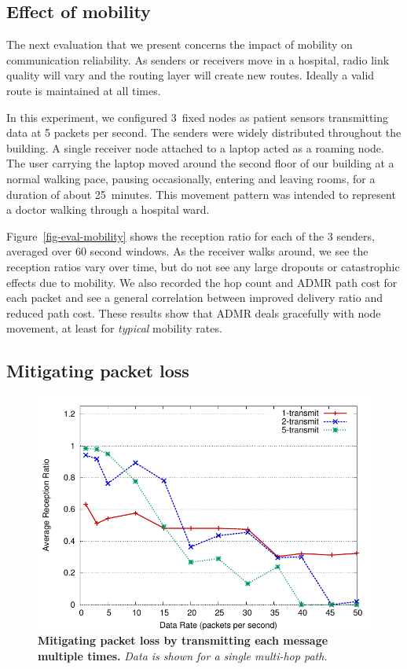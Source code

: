 \subsection{Effect of mobility}


The next evaluation that we present concerns the impact of
mobility on communication reliability. As senders or receivers move in
a hospital, radio link quality will vary and the routing layer will create new
routes. Ideally a valid route is maintained at all times.

In this experiment, we configured 3~fixed nodes as patient sensors
transmitting data at 5 packets per second. The senders were widely
distributed throughout the building. A single receiver node attached to a
laptop acted as a roaming node. The user carrying the laptop
moved around the second floor of our building at a normal walking
pace, pausing occasionally, entering and leaving rooms, for a
duration of about 25~minutes. This movement pattern was intended
to represent a doctor walking through a hospital ward.

Figure~\ref{fig-eval-mobility} shows the reception ratio for each of
the 3 senders, averaged over 60 second windows. As the receiver walks
around, we see the reception ratios vary over time, but do not see any
large dropouts or catastrophic effects due to mobility. We also
recorded the hop count and ADMR path cost for each packet and see a
general correlation between improved delivery ratio and reduced path
cost. These results show that ADMR deals gracefully with node
movement, at least for {\em typical} mobility rates.


\subsection{Mitigating packet loss}

\begin{figure}[t]
\begin{center}
\includegraphics[keepaspectratio,width=.6\hsize]{./resources/codeblue-nsdi06/figures/eval/warmup/kTransmit.pdf}
\end{center}
\caption{\small
  {\bf Mitigating packet loss by transmitting each message multiple times.} {\em Data is shown for a single multi-hop path.}}
\label{fig-eval-ktransmit}
\end{figure}

